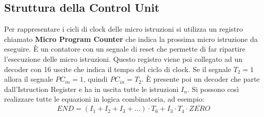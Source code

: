 \documentclass[a4paper]{article}
\theoremstyle{break}
\theoremstyle{break}
\theoremstyle{break}
\theoremstyle{break}
\begin{document}
\subsection{Struttura della Control Unit}
\noindent Per rappresentare i cicli di clock delle micro istruzioni si utilizza un
registro chiamato \textbf{Micro Program Counter} che indica la prossima micro istruzione
da eseguire. È un contatore con un segnale di reset che permette di far ripartire
l'esecuzione delle micro istruzioni. Questo registro viene poi collegato ad un decoder con 16 uscite che indica il tempo
del ciclo di clock. Se il segnale \( T_2 = 1 \) allora il segnale \( PC_{in} = 1 \),
quindi \( PC_{in} = T_2 \). È presente poi un decoder che parte dall'Istruction Register e ha in uscita tutte le istruzioni
\( I_n \). Si possono così realizzare tutte le equazioni in logica combinatoria, ad esempio:
\[
	END = (I_1 + I_2 + I_3 + \ldots) \cdot T_6 + I_3 \cdot T_4 \cdot \overline{ZERO}
\]
\end{document}
